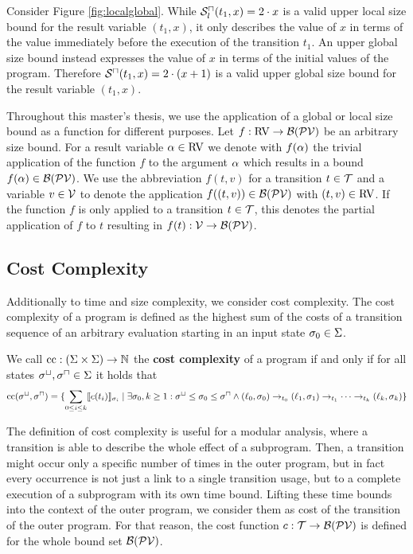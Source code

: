 Consider Figure \ref{fig:localglobal}.
While ${\mathcal{S}^\sqcap_l}(t_1, x) = 2 \cdot x$ is a valid upper local size bound for the result variable $(t_1, x)$, it only describes the value of $x$ in terms of the value immediately before the execution of the transition $t_1$.
An upper global size bound instead expresses the value of $x$ in terms of the initial values of the program.
Therefore ${\mathcal{S}^\sqcap}(t_1, x) = 2 \cdot (x + 1)$ is a valid upper global size bound for the result variable $(t_1, x)$.

Throughout this master's thesis, we use the application of a global or local size bound as a function for different purposes.
Let $f: \text{RV} \rightarrow \mathcal{B}(\mathcal{PV})$ be an arbitrary size bound.
For a result variable $\alpha \in \text{RV}$ we denote with $f(\alpha)$ the trivial application of the function $f$ to the argument $\alpha$ which results in a bound $f(\alpha) \in \mathcal{B}(\mathcal{PV})$.
We use the abbreviation $f(t, v)$ for a transition $t \in \mathcal{T}$ and a variable $v \in \mathcal{V}$ to denote the application $f((t,v)) \in \mathcal{B}(\mathcal{PV})$ with $(t,v) \in \text{RV}$.
If the function $f$ is only applied to a transition $t \in \mathcal{T}$, this denotes the partial application of $f$ to $t$ resulting in $f(t): \mathcal{V} \rightarrow \mathcal{B}(\mathcal{PV})$.

\subsection{Cost Complexity}

Additionally to time and size complexity, we consider cost complexity.
The cost complexity of a program is defined as the highest sum of the costs of a transition sequence of an arbitrary evaluation starting in an input state $\sigma_0 \in \Sigma$.

\begin{definition}
  We call $\text{cc}: (\Sigma \times \Sigma) \rightarrow \mathbb{N}$ the \textbf{cost complexity} of a program if and only if for all states ${\sigma^\sqcup}, {\sigma^\sqcap} \in \Sigma$ it holds that
  \[ \text{cc}({\sigma^\sqcup}, {\sigma^\sqcap}) = \lbrace  \sum_{0 \leq i \leq k} \llbracket c(t_i) \rrbracket_{\sigma_i} \mid \exists \sigma_0, k \geq 1: {\sigma^\sqcup} \leq \sigma_0 \leq {\sigma^\sqcap} \wedge (\ell_0, \sigma_0) \rightarrow_{t_0} (\ell_1, \sigma_1) \rightarrow_{t_1} \dots \rightarrow_{t_k} (\ell_k, \sigma_k)  \rbrace \]
\end{definition}

The definition of cost complexity is useful for a modular analysis, where a transition is able to describe the whole effect of a subprogram.
Then, a transition might occur only a specific number of times in the outer program, but in fact every occurrence is not just a link to a single transition usage, but to a complete execution of a subprogram with its own time bound.
Lifting these time bounds into the context of the outer program, we consider them as cost of the transition of the outer program. 
For that reason, the cost function $c: \mathcal{T} \rightarrow \mathcal{B}(\mathcal{PV})$ is defined for the whole bound set $\mathcal{B}(\mathcal{PV})$.

